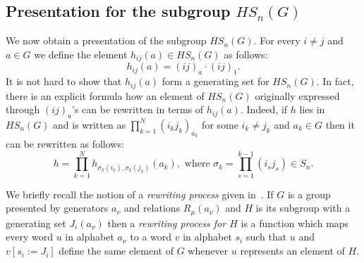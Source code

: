 \documentclass[oneside, 10pt]{amsart}
\theoremstyle{plain}
\numberwithin{equation}{section}
\numberwithin{lemma}{section}
\theoremstyle{remark}
\theoremstyle{definition}
\begin{document}
\subsection{Presentation for the subgroup $HS_n(G)$}
We now obtain a presentation of the subgroup $HS_n(G)$.
For every $i\neq j$ and $a\in G$ we define the element $h_{ij}(a) \in HS_n(G)$ as follows:
\begin{equation} \label{eq:h-def} 
h_{ij}(a) = (ij)_{a} \cdot (ij)_1. 
\end{equation}
It is not hard to show that $h_{ij}(a)$ form a generating set for $HS_n(G)$.
In fact, there is an explicit formula how an element of $HS_n(G)$ originally expressed through $(ij)_{a}$'s can be rewritten in terms of $h_{ij}(a)$.
Indeed, if $h$ lies in $HS_n(G)$ and is written as $\prod_{k=1}^N(i_k j_k)_{a_k}$ for some $i_k\neq j_k$ and $a_k\in G$ then it can be rewritten as follows:
\begin{equation} \label{eq:rp} \tag{$\tau$}
 h = \prod_{k=1}^N h_{\sigma_k(i_k), \sigma_k(j_k)}(a_k),\text{ where } \sigma_k=\prod_{s=1}^{k-1} (i_s j_s) \in S_n. \end{equation}

We briefly recall the notion of a {\it rewriting process} given in~\cite[\S~2.3]{MKS76}.
If $G$ is a group presented by generators $a_\nu$ and relations $R_{\mu}(a_{\nu})$ and $H$ is its subgroup with a generating set $J_i(a_\nu)$ then
 a {\it rewriting process for $H$} is a function which maps every word $u$ in alphabet $a_\nu$ to a word $v$ in alphabet $s_i$ such that
 $u$ and $v[s_i:=J_i]$ define the same element of $G$ whenever $u$ represents an element of $H$.
\end{document}
